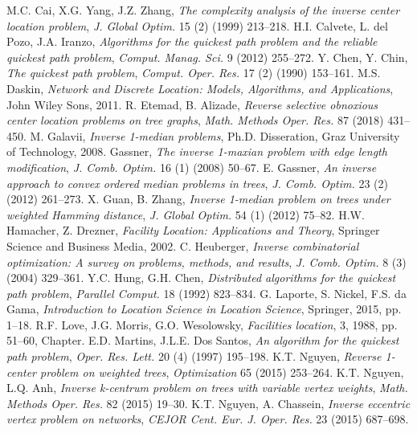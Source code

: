 \documentclass[12pt,oneside,a4paper]{bookAnh1}
\theoremstyle{plain}
\theoremstyle{nonumberplain}
\numberwithin{equation}{chapter}
\begin{document}
{\begin{thebibliography}{99}
     M.C. Cai, X.G. Yang, J.Z. Zhang, \emph{The complexity analysis of the inverse center location problem}, \emph{J. Global Optim.} 15 (2) (1999) 213–218.
     H.I. Calvete, L. del Pozo, J.A. Iranzo, \emph{Algorithms for the quickest path problem and the reliable quickest path problem}, \emph{Comput. Manag. Sci.} 9 (2012) 255–272.
     Y. Chen, Y. Chin, \emph{The quickest path problem}, \emph{Comput. Oper. Res.} 17 (2) (1990) 153–161.
     M.S. Daskin, \emph{Network and Discrete Location: Models, Algorithms, and Applications}, John Wiley Sons, 2011.
     R. Etemad, B. Alizade, \emph{Reverse selective obnoxious center location problems on tree graphs}, \emph{Math. Methods Oper. Res.} 87 (2018) 431–450.
     M. Galavii, \emph{Inverse 1-median problems}, Ph.D. Disseration, Graz University of Technology, 2008.
     Gassner, \emph{The inverse 1-maxian problem with edge length modification}, \emph{J. Comb. Optim.} 16 (1) (2008) 50–67.
     E. Gassner, \emph{An inverse approach to convex ordered median problems in trees}, \emph{J. Comb. Optim.} 23 (2) (2012) 261–273.
     X. Guan, B. Zhang, \emph{Inverse 1-median problem on trees under weighted Hamming distance}, \emph{J. Global Optim.} 54 (1) (2012) 75–82.
     H.W. Hamacher, Z. Drezner, \emph{Facility Location: Applications and Theory}, Springer Science and Business Media, 2002.
     C. Heuberger, \emph{Inverse combinatorial optimization: A survey on problems, methods, and results}, \emph{J. Comb. Optim.} 8 (3) (2004) 329–361.
     Y.C. Hung, G.H. Chen, \emph{Distributed algorithms for the quickest path problem}, \emph{Parallel Comput.} 18 (1992) 823–834.
     G. Laporte, S. Nickel, F.S. da Gama, \emph{Introduction to Location Science in Location Science}, Springer, 2015, pp. 1–18.
     R.F. Love, J.G. Morris, G.O. Wesolowsky, \emph{Facilities location}, 3, 1988, pp. 51–60, Chapter.
     E.D. Martins, J.L.E. Dos Santos, \emph{An algorithm for the quickest path problem}, \emph{Oper. Res. Lett.} 20 (4) (1997) 195–198.
     K.T. Nguyen, \emph{Reverse 1-center problem on weighted trees}, \emph{Optimization} 65 (2015) 253–264.
     K.T. Nguyen, L.Q. Anh, \emph{Inverse k-centrum problem on trees with variable vertex weights}, \emph{Math. Methods Oper. Res.} 82 (2015) 19–30.
     K.T. Nguyen, A. Chassein, \emph{Inverse eccentric vertex problem on networks}, \emph{CEJOR Cent. Eur. J. Oper. Res.} 23 (2015) 687–698.

\end{thebibliography}}
\end{document}
